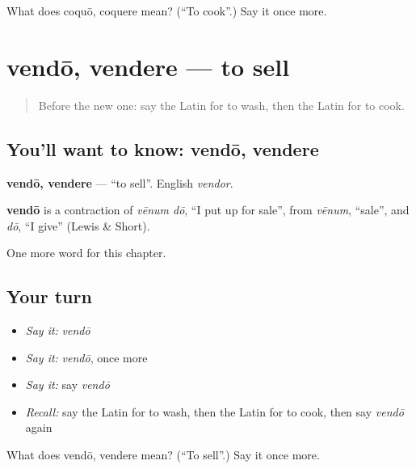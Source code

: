 \begin{tcolorbox}[breakable,colback=teal!4,colframe=teal!35!black,title={Before you move on}]
What does coquō, coquere mean? (\textquotedblleft{}To cook\textquotedblright{}.) Say it once more.
\end{tcolorbox}
\section[vendō, vendere]{vendō, vendere — to sell}

\label{lesson:LA-C76-vendo}



\begin{quote}
Before the new one: say the Latin for to wash, then the Latin for to cook.
\end{quote}

\subsection*{You'll want to know: vendō, vendere}
\textbf{vendō, vendere} — \textquotedblleft{}to sell\textquotedblright{}. English \emph{vendor}.

\begin{cousinweb}
\textbf{vendō} is a contraction of \emph{vēnum dō}, \textquotedblleft{}I put up for sale\textquotedblright{}, from \emph{vēnum}, \textquotedblleft{}sale\textquotedblright{}, and \emph{dō}, \textquotedblleft{}I give\textquotedblright{} (Lewis \& Short).
\end{cousinweb}

\begin{grammarlens}[title={What you've built}]
One more word for this chapter.
\end{grammarlens}

\subsection*{Your turn}
\begin{itemize}
\raggedright
  \item \emph{Say it:} \emph{vendō}
  \item \emph{Say it:} \emph{vendō}, once more
  \item \emph{Say it:} say \emph{vendō}
  \item \emph{Recall:} say the Latin for to wash, then the Latin for to cook, then say \emph{vendō} again
\end{itemize}

\begin{tcolorbox}[breakable,colback=teal!4,colframe=teal!35!black,title={Before you move on}]
What does vendō, vendere mean? (\textquotedblleft{}To sell\textquotedblright{}.) Say it once more.
\end{tcolorbox}
